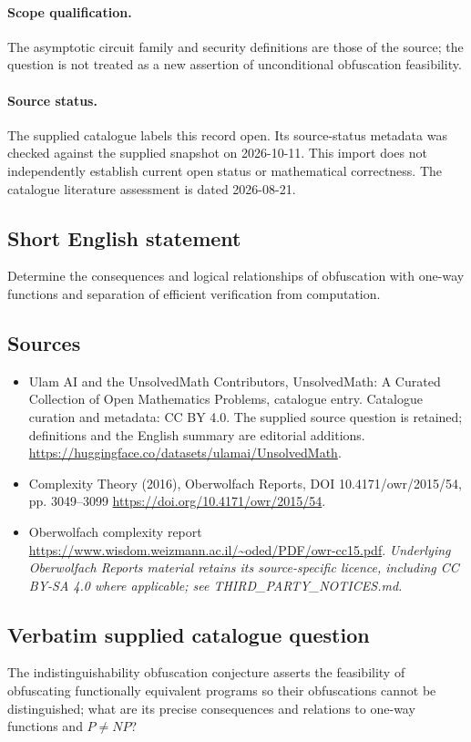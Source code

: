 \documentclass[11pt]{article}
\begin{document}
\paragraph{Scope qualification.}
The asymptotic circuit family and security definitions are those of the source; the question is not treated as a new assertion of unconditional obfuscation feasibility.
\paragraph{Source status.}
The supplied catalogue labels this record open. Its source-status metadata was checked against the supplied snapshot on 2026-10-11. This import does not independently establish current open status or mathematical correctness. The catalogue literature assessment is dated 2026-08-21.
\subsection{Short English statement}
Determine the consequences and logical relationships of obfuscation with one-way functions and separation of efficient verification from computation.
\subsection{Sources}
\begin{itemize}
\item[S1] Ulam AI and the UnsolvedMath Contributors, UnsolvedMath: A Curated Collection of Open Mathematics Problems, catalogue entry. Catalogue curation and metadata: CC BY 4.0. The supplied source question is retained; definitions and the English summary are editorial additions.
\url{https://huggingface.co/datasets/ulamai/UnsolvedMath}.
\item[S2] Complexity Theory (2016), Oberwolfach Reports, DOI 10.4171/owr/2015/54, pp. 3049--3099
\url{https://doi.org/10.4171/owr/2015/54}.
\item[S3] Oberwolfach complexity report
\url{https://www.wisdom.weizmann.ac.il/~oded/PDF/owr-cc15.pdf}.
\textit{Underlying Oberwolfach Reports material retains its source-specific licence, including CC BY-SA 4.0 where applicable; see THIRD\_PARTY\_NOTICES.md.}
\end{itemize}
\subsection{Verbatim supplied catalogue question}
The indistinguishability obfuscation conjecture asserts the feasibility of obfuscating functionally equivalent programs so their obfuscations cannot be distinguished; what are its precise consequences and relations to one-way functions and $P\neq NP$?
\end{document}
